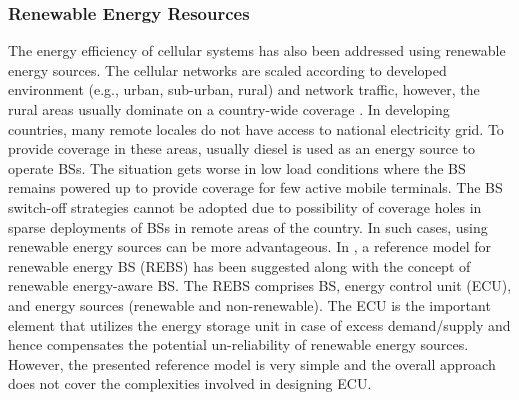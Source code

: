 \documentclass[article,10pt,twocolumn]{IEEEtran}
\begin{document}
\subsubsection{Renewable Energy Resources}\label{sec:re-new res}
The energy efficiency of cellular systems has also been addressed using renewable energy sources. The cellular networks are scaled according to developed environment (e.g., urban, sub-urban, rural) and network traffic, however, the rural areas usually dominate on a country-wide coverage \citep{6056691}. In developing countries, many remote locales do not have access to national electricity grid. To provide coverage in these areas, usually diesel is used as an energy source to operate BSs. The situation gets worse in low load conditions where the BS remains powered up to provide coverage for few active mobile terminals. The BS switch-off strategies cannot be adopted due to possibility of coverage holes in sparse deployments of BSs in remote areas of the country. In such cases, using renewable energy sources can be more advantageous. In \citep{6731020}, a reference model for renewable energy BS (REBS) has been suggested along with the concept of renewable energy-aware BS. The REBS comprises BS, energy control unit (ECU), and energy sources (renewable and non-renewable). The ECU is the important element that utilizes the energy storage unit in case of excess demand/supply and hence compensates the potential un-reliability of renewable energy sources. However, the presented reference model is very simple and the overall approach does not cover the complexities involved in designing ECU.
\end{document}
